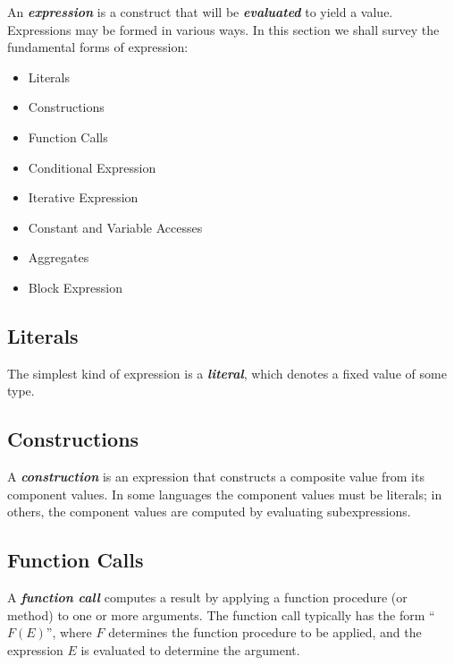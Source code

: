 \documentclass{article}
\begin{document}
An \textbf{\textit{expression}} is a construct that will be \textbf{\textit{evaluated}} to yield a value. Expressions may be formed in various ways. In this section we shall survey the fundamental forms of expression:
\begin{multicols}{2}
\begin{itemize}
    \item Literals
    \item Constructions
    \item Function Calls
    \item Conditional Expression
\end{itemize}

\begin{itemize}
    \item Iterative Expression
    \item Constant and Variable Accesses
    \item Aggregates
    \item Block Expression
\end{itemize}
\end{multicols}
    

\subsection{Literals}

The simplest kind of expression is a \textbf{\textit{literal}}, which denotes a fixed value of some type.

\subsection{Constructions}

A \textbf{\textit{construction}} is an expression that constructs a composite value from its component values. In some languages the component values must be literals; in others, the component values are computed by evaluating subexpressions.

\subsection{Function Calls}

A \textbf{\textit{function call}} computes a result by applying a function procedure (or method) to one or more arguments. The function call typically has the form ``$F(E)$'', where $F$ determines the function procedure to be applied, and the expression $E$ is evaluated to determine the argument.
\end{document}
